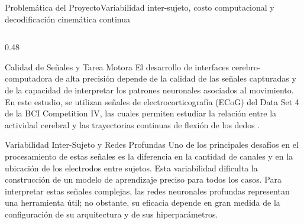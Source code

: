 \begin{frame}{Problem\'atica del Proyecto}{Variabilidad inter-sujeto, costo computacional y decodificaci\'on cinem\'atica continua \cite{miller2008prediction}}
  \begin{columns}[T,onlytextwidth]
    \begin{column}{0.48\textwidth}
      \begin{block}{Calidad de Se\~nales y Tarea Motora}
        \scriptsize
        El desarrollo de interfaces cerebro-computadora de alta precisi\'on depende de la calidad de las se\~nales capturadas y de la capacidad de interpretar los patrones neuronales asociados al movimiento. En este estudio, se utilizan se\~nales de electrocorticograf\'ia (ECoG) del Data Set 4 de la BCI Competition IV, las cuales permiten estudiar la relaci\'on entre la actividad cerebral y las trayectorias continuas de flexi\'on de los dedos \cite{miller2008prediction}.
      \end{block}
      \vspace{1.5mm}
      \begin{block}{Variabilidad Inter-Sujeto y Redes Profundas}
        \scriptsize
        Uno de los principales desaf\'ios en el procesamiento de estas se\~nales es la diferencia en la cantidad de canales y en la ubicaci\'on de los electrodos entre sujetos. Esta variabilidad dificulta la construcci\'on de un modelo de aprendizaje preciso para todos los casos. Para interpretar estas se\~nales complejas, las redes neuronales profundas representan una herramienta \'util; no obstante, su eficacia depende en gran medida de la configuraci\'on de su arquitectura y de sus hiperpar\'ametros.
      \end{block}
    \end{column}


\end{columns}
\end{frame}
